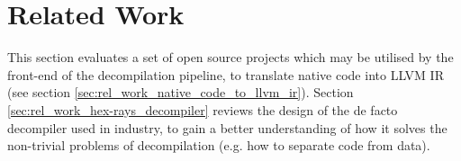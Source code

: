 
\section{Related Work}
\label{sec:related_work}

This section evaluates a set of open source projects which may be utilised by the front-end of the decompilation pipeline, to translate native code into LLVM IR (see section \ref{sec:rel_work_native_code_to_llvm_ir}). Section \ref{sec:rel_work_hex-rays_decompiler} reviews the design of the de facto decompiler used in industry, to gain a better understanding of how it solves the non-trivial problems of decompilation (e.g. how to separate code from data).




